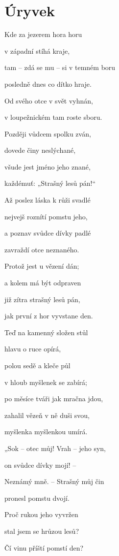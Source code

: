 \documentclass[11pt]{article}
\begin{document}
    \begin{center}
        \underline{\textbf{\Huge }}
    \end{center}
    \section*{Úryvek}
    Kde za jezerem hora horu

    v západní stíhá kraje,

tam – zdá se mu – si v temném boru

posledně dnes co dítko hraje.

Od svého otce v svět vyhnán,

v loupežnickém tam roste sboru.

Později vůdcem spolku zván,

dovede činy neslýchané,

všude jest jméno jeho znané,

každémuť: „Strašný lesů pán!“

Až poslez láska k růži svadlé

nejvejš roznítí pomstu jeho,

a poznav svůdce dívky padlé

zavraždí otce neznaného.

Protož jest u vězení dán;

a kolem má být odpraven

již zítra strašný lesů pán,

jak první z hor vyvstane den.

\bigskip

Teď na kamenný složen stůl

hlavu o ruce opírá,

polou sedě a kleče půl

v hloub myšlenek se zabírá;

po měsíce tváři jak mračna jdou,

zahalil vězeň v ně duši svou,

myšlenka myšlenkou umírá.

\bigskip

„Sok – otec můj! Vrah – jeho syn,

on svůdce dívky mojí! –

Neznámý mně. – Strašný můj čin

pronesl pomstu dvojí.

Proč rukou jeho vyvržen

stal jsem se hrůzou lesů?

Čí vinu příští pomstí den?
\end{document}
